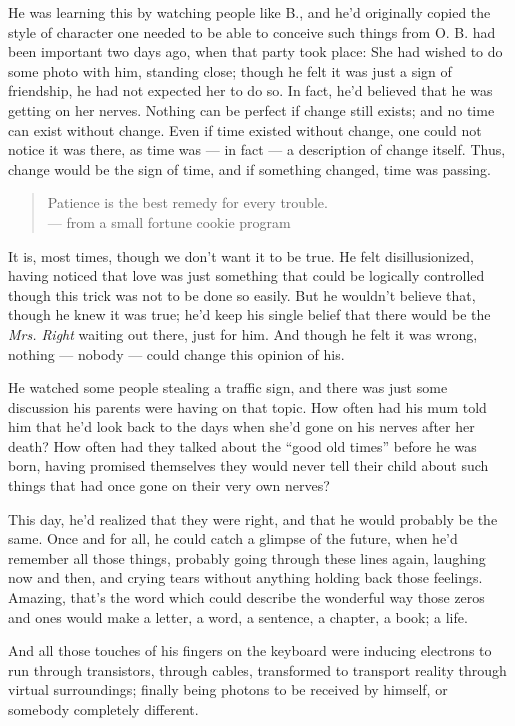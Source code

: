 He was learning this by watching people like B., and he'd originally copied the style of character one needed to be able to conceive such things from O. B. had been important two days ago, when that party took place: She had wished to do some photo with him, standing close; though he felt it was just a sign of friendship, he had not expected her to do so. In fact, he'd believed that he was getting on her nerves. 
Nothing can be perfect if change still exists; and no time can exist without change. Even if time existed without change, one could not notice it was there, as time was --- in fact --- a description of change itself. Thus, change would be the sign of time, and if something changed, time was passing.
\begin{verse}
Patience is the best remedy for every trouble.\\
--- from a small fortune cookie program
\end{verse}
It is, most times, though we don't want it to be true. 
He felt disillusionized, having noticed that love was just something that could be logically controlled though this trick was not to be done so easily. But he wouldn't believe that, though he knew it was true; he'd keep his single belief that there would be the \emph{Mrs. Right} waiting out there, just for him. And though he felt it was wrong, nothing --- nobody --- could change this opinion of his.

He watched some people stealing a traffic sign, and there was just some discussion his parents were having on that topic. How often had his mum told him that he'd look back to the days when she'd gone on his nerves after her death? How often had they talked about the \enquote{good old times} before he was born, having promised themselves they would never tell their child about such things that had once gone on their very own nerves?

This day, he'd realized that they were right, and that he would probably be the same. Once and for all, he could catch a glimpse of the future, when he'd remember all those things, probably going through these lines again, laughing now and then, and crying tears without anything holding back those feelings. Amazing, that's the word which could describe the wonderful way those zeros and ones would make a letter, a word, a sentence, a chapter, a book; a life.

And all those touches of his fingers on the keyboard were inducing electrons to run through transistors, through cables, transformed to transport reality through virtual surroundings; finally being photons to be received by himself, or somebody completely different.

